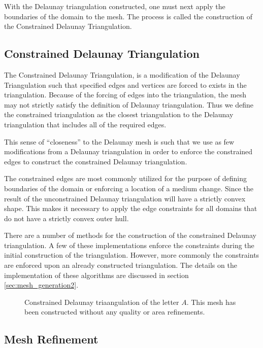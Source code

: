 \documentclass[../fem.tex]{subfile}
\begin{document}
With the Delaunay triangulation constructed, one must next apply the boundaries
of the domain to the mesh. The process is called the construction of the
Constrained Delaunay Triangulation.

\subsection{Constrained Delaunay Triangulation}%
\label{sub:constrained_delaunay_triangulation}

The Constrained Delaunay Triangulation, is a modification of the Delaunay
Triangulation such that specified edges and vertices are forced to exists in
the triangulation. Because of the forcing of edges into the triangulation, the
mesh may not strictly satisfy the definition of Delaunay triangulation. Thus we
define the constrained triangulation as the closest triangulation to the
Delaunay triangulation that includes all of the required edges.

This sense of ``closeness'' to the Delaunay mesh is such that we use as few
modifications from a Delaunay triangulation in order to enforce the constrained
edges to construct the constrained Delaunay triangulation.

The constrained edges are most commonly utilized for the purpose of defining
boundaries of the domain or enforcing a location of a medium change. Since the
result of the unconstrained Delaunay triangulation will have a strictly convex
shape. This makes it necessary to apply the edge constraints for all domains
that do not have a strictly convex outer hull.

There are a number of methods for the construction of the constrained Delaunay
triangulation. A few of these implementations enforce the constraints during
the initial construction of the triangulation. However, more commonly the
constraints are enforced upon an already constructed triangulation. The details
on the implementation of these algorithms are discussed in section
\ref{sec:mesh_generation2}.

\begin{figure}[htpb]
  \centering
  
  \caption{Constrained Delaunay triaangulation of the letter $A$. This mesh has
  been constructed without any quality or area refinements.}
  \label{fig:delaunay_constrained}
\end{figure}

\subsection{Mesh Refinement}%
\label{sub:mesh_refinement}
\end{document}
